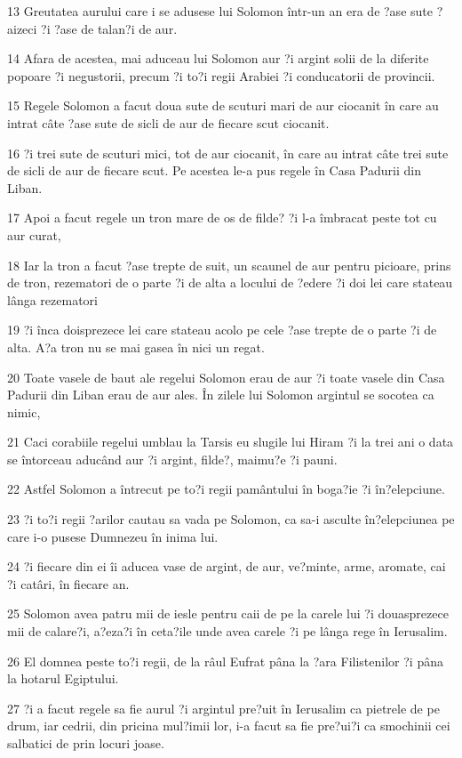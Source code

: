 \par 13 Greutatea aurului care i se adusese lui Solomon într-un an era de ?ase sute ?aizeci ?i ?ase de talan?i de aur.
\par 14 Afara de acestea, mai aduceau lui Solomon aur ?i argint solii de la diferite popoare ?i negustorii, precum ?i to?i regii Arabiei ?i conducatorii de provincii.
\par 15 Regele Solomon a facut doua sute de scuturi mari de aur ciocanit în care au intrat câte ?ase sute de sicli de aur de fiecare scut ciocanit.
\par 16 ?i trei sute de scuturi mici, tot de aur ciocanit, în care au intrat câte trei sute de sicli de aur de fiecare scut. Pe acestea le-a pus regele în Casa Padurii din Liban.
\par 17 Apoi a facut regele un tron mare de os de filde? ?i l-a îmbracat peste tot cu aur curat,
\par 18 Iar la tron a facut ?ase trepte de suit, un scaunel de aur pentru picioare, prins de tron, rezematori de o parte ?i de alta a locului de ?edere ?i doi lei care stateau lânga rezematori
\par 19 ?i înca doisprezece lei care stateau acolo pe cele ?ase trepte de o parte ?i de alta. A?a tron nu se mai gasea în nici un regat.
\par 20 Toate vasele de baut ale regelui Solomon erau de aur ?i toate vasele din Casa Padurii din Liban erau de aur ales. În zilele lui Solomon argintul se socotea ca nimic,
\par 21 Caci corabiile regelui umblau la Tarsis eu slugile lui Hiram ?i la trei ani o data se întorceau aducând aur ?i argint, filde?, maimu?e ?i pauni.
\par 22 Astfel Solomon a întrecut pe to?i regii pamântului în boga?ie ?i în?elepciune.
\par 23 ?i to?i regii ?arilor cautau sa vada pe Solomon, ca sa-i asculte în?elepciunea pe care i-o pusese Dumnezeu în inima lui.
\par 24 ?i fiecare din ei îi aducea vase de argint, de aur, ve?minte, arme, aromate, cai ?i catâri, în fiecare an.
\par 25 Solomon avea patru mii de iesle pentru caii de pe la carele lui ?i douasprezece mii de calare?i, a?eza?i în ceta?ile unde avea carele ?i pe lânga rege în Ierusalim.
\par 26 El domnea peste to?i regii, de la râul Eufrat pâna la ?ara Filistenilor ?i pâna la hotarul Egiptului.
\par 27 ?i a facut regele sa fie aurul ?i argintul pre?uit în Ierusalim ca pietrele de pe drum, iar cedrii, din pricina mul?imii lor, i-a facut sa fie pre?ui?i ca smochinii cei salbatici de prin locuri joase.
